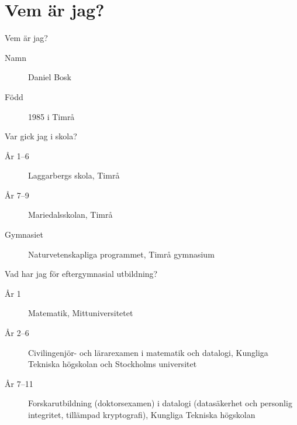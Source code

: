 \mode*

\begin{frame}
  \tableofcontents
\end{frame}

\section{Vem är jag?}


\begin{frame}
  \begin{block}{Vem är jag?}
    \begin{description}
      \item[Namn] Daniel Bosk
      \item[Född] 1985 i Timrå
    \end{description}
  \end{block}

  \begin{block}{Var gick jag i skola?}
    \begin{description}
      \item[År 1--6] Laggarbergs skola, Timrå
      \item[År 7--9] Mariedalsskolan, Timrå
      \item[Gymnasiet] Naturvetenskapliga programmet, Timrå gymnasium
    \end{description}
  \end{block}
\end{frame}

\begin{frame}
  \begin{block}{Vad har jag för eftergymnasial utbildning?}
    \begin{description}
      \item[År 1]  Matematik, Mittuniversitetet
      \item[År 2--6] Civilingenjör- och lärarexamen i matematik och datalogi,
        Kungliga Tekniska högskolan och Stockholms universitet
      \item[År 7--11] Forskarutbildning (doktorsexamen) i datalogi 
        (datasäkerhet och personlig integritet, tillämpad kryptografi),
        Kungliga Tekniska högskolan
    \end{description}
  \end{block}
\end{frame}

